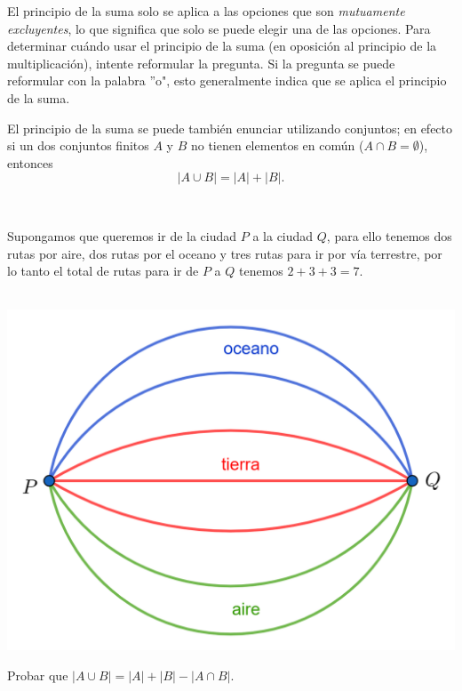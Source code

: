 \begin{obs}
El principio de la suma solo se aplica a las opciones que son \textit{mutuamente excluyentes}, lo que significa que solo se puede elegir una de las opciones. Para determinar cuándo usar el principio de la suma (en oposición al principio de la multiplicación), intente reformular la pregunta. Si la pregunta se puede reformular con la palabra ''o", esto generalmente indica que se aplica el principio de la suma.
\end{obs}

El principio de la suma se puede también enunciar utilizando conjuntos; en efecto si un dos conjuntos finitos $A$ y $B$ no tienen elementos en común ($A\cap B=\emptyset$), entonces $$|A\cup B|=|A|+|B|.$$ 

\begin{multicols}{2}
\,\
\begin{ejemplo}

 Supongamos que queremos ir de la ciudad $P$ a la ciudad $Q$, para ello tenemos dos rutas por aire, dos rutas por el oceano y tres rutas para ir por vía terrestre, por lo tanto el total de rutas para ir de $P$ a $Q$ tenemos $2+3+3=7$.
 \,\\
 \,\\

\begin{center}
    \includegraphics[scale=0.3]{Imagenes/IMG1/S1-1-06.png}
\end{center}       
\end{ejemplo}
\end{multicols}

\begin{ejemplo}
Probar que $|A \cup B|=|A|+|B|-|A\cap B|$.
\end{ejemplo}

